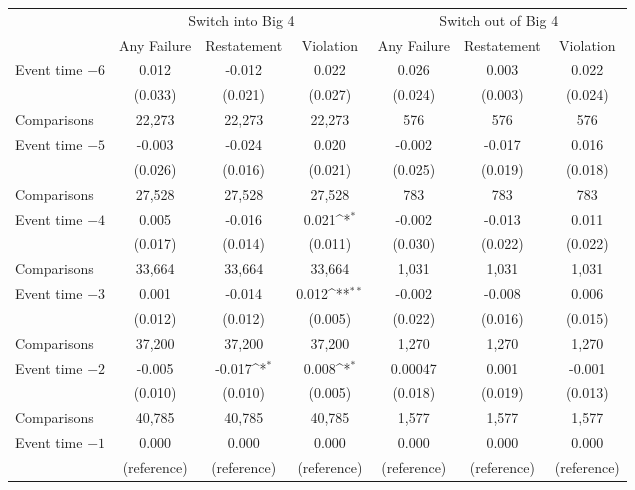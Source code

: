\documentclass[10pt]{article}
\newcommand{\sym}[1]{\textsuperscript{#1}}
\begin{document}
\begin{minipage}{19cm}\fontsize{10}{12}\selectfont\setlength{\tabcolsep}{4pt}\renewcommand{\arraystretch}{1.15}


\def\sym#1{\ifmmode^{#1}\else\(^{#1}\)\fi}
\centering
{}
\label{tab:big4-eventstudy-dcdh}
\begin{threeparttable}

\begin{tabular}{l c c c c c c }
\toprule
 & \multicolumn{3}{c}{Switch into Big 4} & \multicolumn{3}{c}{Switch out of Big 4} \\
\cmidrule(lr){2-4}\cmidrule(lr){5-7}
 & Any Failure & Restatement & Violation & Any Failure & Restatement & Violation \\
\midrule
Event time $-6$ & 0.012 & -0.012 & 0.022 & 0.026 & 0.003 & 0.022 \\
 & (0.033) & (0.021) & (0.027) & (0.024) & (0.003) & (0.024) \\
Comparisons & 22,273 & 22,273 & 22,273 & 576 & 576 & 576 \\
Event time $-5$ & -0.003 & -0.024 & 0.020 & -0.002 & -0.017 & 0.016 \\
 & (0.026) & (0.016) & (0.021) & (0.025) & (0.019) & (0.018) \\
Comparisons & 27,528 & 27,528 & 27,528 & 783 & 783 & 783 \\
Event time $-4$ & 0.005 & -0.016 & 0.021\sym{*} & -0.002 & -0.013 & 0.011 \\
 & (0.017) & (0.014) & (0.011) & (0.030) & (0.022) & (0.022) \\
Comparisons & 33,664 & 33,664 & 33,664 & 1,031 & 1,031 & 1,031 \\
Event time $-3$ & 0.001 & -0.014 & 0.012\sym{**} & -0.002 & -0.008 & 0.006 \\
 & (0.012) & (0.012) & (0.005) & (0.022) & (0.016) & (0.015) \\
Comparisons & 37,200 & 37,200 & 37,200 & 1,270 & 1,270 & 1,270 \\
Event time $-2$ & -0.005 & -0.017\sym{*} & 0.008\sym{*} & 0.00047 & 0.001 & -0.001 \\
 & (0.010) & (0.010) & (0.005) & (0.018) & (0.019) & (0.013) \\
Comparisons & 40,785 & 40,785 & 40,785 & 1,577 & 1,577 & 1,577 \\
Event time $-1$ & 0.000 & 0.000 & 0.000 & 0.000 & 0.000 & 0.000 \\
 & (reference) & (reference) & (reference) & (reference) & (reference) & (reference) \\

\end{tabular}
\end{threeparttable}
\end{minipage}
\end{document}
